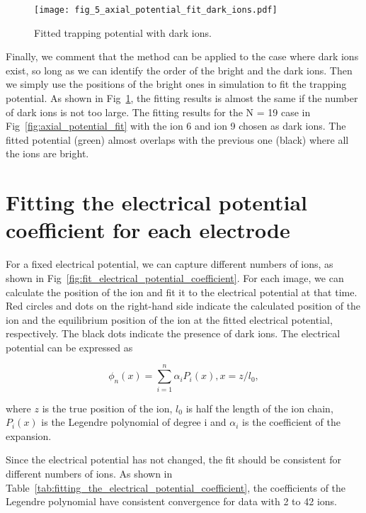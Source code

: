 \begin{figure}
    \centering
    \texttt{[image: fig\_5\_axial\_potential\_fit\_dark\_ions.pdf]}
    \caption{Fitted trapping potential with dark ions.}
    \label{fig:axial_potential_fit_dark_ions}
\end{figure}

Finally, we comment that the method can be applied to the case where dark ions exist, so long as we can identify the order of the bright and the dark ions. Then we simply use the positions of the bright ones in simulation to fit the trapping potential. As shown in Fig~\ref{fig:axial_potential_fit_dark_ions}, the fitting results is almost the same if the number of dark ions is not too large. The fitting results for the N = 19 case in Fig~\ref{fig:axial_potential_fit} with the ion 6 and ion 9 chosen as dark ions. The fitted potential (green) almost overlaps with the previous one (black) where
all the ions are bright.



\section{Fitting the electrical potential coefficient for each electrode}

For a fixed electrical potential, we can capture different numbers of ions, as shown in Fig~\ref{fig:fit_electrical_potential_coefficient}. For each image, we can calculate the position of the ion and fit it to the electrical potential at that time. Red circles and dots on the right-hand side indicate the calculated position of the ion and the equilibrium position of the ion at the fitted electrical potential, respectively. The black dots indicate the presence of dark ions. The electrical potential can be expressed as

\begin{equation}
    \phi_n(x)=\sum_{i=1}^n \alpha_i P_i(x), x=z / l_0,
\end{equation}

where $z$ is the true position of the ion, $l_0$ is half the length of the ion chain, $P_i(x)$ is the Legendre polynomial of degree i and $\alpha_i$ is the coefficient of the expansion.

Since the electrical potential has not changed, the fit should be consistent for different numbers of ions. As shown in Table~\ref{tab:fitting_the_electrical_potential_coefficient}, the coefficients of the Legendre polynomial have consistent convergence for data with 2 to 42 ions.

